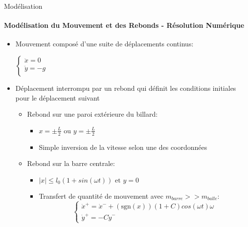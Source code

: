 \documentclass{beamer}
\begin{document}
  \begin{frame}{Modélisation}
  \framesubtitle{Modélisation du Mouvement et des Rebonds - Résolution Numérique}
  \begin{itemize}
    \item Mouvement composé d'une suite de déplacements continus:\\
    \pause \begin{center}
      \(\begin{cases}
        {\textstyle \ddot{x}=0}\\
        {\textstyle \ddot{y}=-g}\\
      \end{cases}\)
    \end{center}
    \pause \item Déplacement interrompu par un rebond qui définit les conditions initiales pour le déplacement suivant
    \begin{itemize}
      \pause \item Rebond sur une paroi extérieure du billard:
      \begin{itemize}
        \item \(x=\pm \frac{L}{2} \text{ ou } y=\pm \frac{L}{2}\)
        \item Simple inversion de la vitesse selon une des coordonnées 
      \end{itemize}
      \pause \item Rebond sur la barre centrale:
      \begin{itemize}
        \item \(\lvert x \rvert \leq l_0(1+sin(\omega t)) \text{ et } y=0\)
        \item Transfert de quantité de mouvement avec \({\scriptstyle m_{barre}>>m_{balle}}\):
        \[\begin{cases}
          \dot{x}^+=\dot{x}^- +  (\text{sgn}(x))(1+C)cos(\omega t)\omega\\
          \dot{y}^+=-C \dot{y}^-
        \end{cases}\]
      \end{itemize}
    \end{itemize}
  \end{itemize}
  \end{frame}
\end{document}
